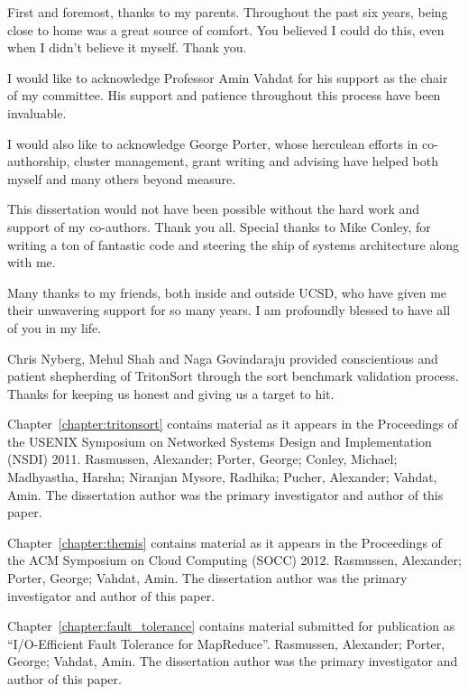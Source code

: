 \begin{acknowledgements}

First and foremost, thanks to my parents. Throughout the past six years, being
close to home was a great source of comfort. You believed I could do this, even
when I didn't believe it myself. Thank you.

I would like to acknowledge Professor Amin Vahdat for his support as the chair
of my committee.  His support and patience throughout this process have been
invaluable.

I would also like to acknowledge George Porter, whose herculean efforts in
co-authorship, cluster management, grant writing and advising have helped
both myself and many others beyond measure.

This dissertation would not have been possible without the hard work and
support of my co-authors. Thank you all. Special thanks to Mike Conley, for
writing a ton of fantastic code and steering the ship of systems architecture
along with me.

Many thanks to my friends, both inside and outside UCSD, who have given me
their unwavering support for so many years. I am profoundly blessed to have all
of you in my life.

Chris Nyberg, Mehul Shah and Naga Govindaraju provided conscientious and
patient shepherding of TritonSort through the sort benchmark validation
process. Thanks for keeping us honest and giving us a target to hit.

Chapter~\ref{chapter:tritonsort} contains material as it appears in the
Proceedings of the USENIX Symposium on Networked Systems Design and
Implementation (NSDI) 2011. Rasmussen, Alexander; Porter, George; Conley,
Michael; Madhyastha, Harsha; Niranjan Mysore, Radhika; Pucher, Alexander;
Vahdat, Amin. The dissertation author was the primary investigator and author
of this paper.

Chapter~\ref{chapter:themis} contains material as it appears in the Proceedings
of the ACM Symposium on Cloud Computing (SOCC) 2012. Rasmussen, Alexander;
Porter, George; Vahdat, Amin. The dissertation author was the primary
investigator and author of this paper.

Chapter~\ref{chapter:fault_tolerance} contains material submitted for
publication as ``I/O-Efficient Fault Tolerance for MapReduce''. Rasmussen,
Alexander; Porter, George; Vahdat, Amin. The dissertation author was the
primary investigator and author of this paper.

\end{acknowledgements}

